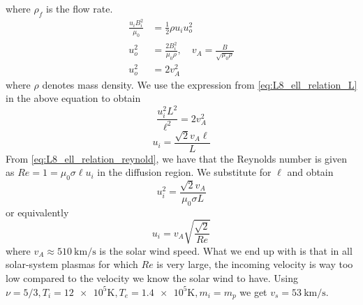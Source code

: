 where \(\rho_f\) is the flow rate.
\begin{align*}
    \frac{u_{i}B_i^2}{\mu_0}&=\frac{1}{2}\rho u_{i}u_o^2\\
    u_o^2&=\frac{2B_i^2}{\mu_0\rho},\quad v_A=\frac{B}{\sqrt{\mu_0\rho}}\\
    u_o^2&=2v_A^2
\end{align*}
where \(\rho \) denotes mass density. We use the expression from \cref{eq:L8_ell_relation_L} in the above equation to obtain
\begin{equation*}
    \frac{u_i^2L^2}{\ell^2}=2v_A^2
\end{equation*}
\begin{equation*}
    u_i=\frac{\sqrt{2}v_A\ell}{L}
\end{equation*}
From \cref{eq:L8_ell_relation_reynold}, we have that the Reynolds number is given as \(Re=1=\mu_0\sigma\ell u_i\) in the diffusion region. We substitute for \(\ell \) and obtain
\begin{equation*}
    u_i^2=\frac{\sqrt{2}v_A}{\mu_0\sigma L}
\end{equation*}
or equivalently
\begin{equation*}
    u_i=v_A\sqrt{\frac{\sqrt{2}}{Re}}
\end{equation*}
where \(v_A\approx\SI{510}{\kilo\metre/\second}\) is the solar wind speed. What we end up with is that in all solar-system plasmas for which \(Re\) is very large, the incoming velocity is way too low compared to the velocity we know the solar wind to have. Using \(\nu=5/3, T_i=\num{12e5}\si{\kelvin},T_e=\num{1.4e5}\si{\kelvin}, m_i=m_p\) we get \(v_s=\SI{53}{\kilo\metre/\second}\).

